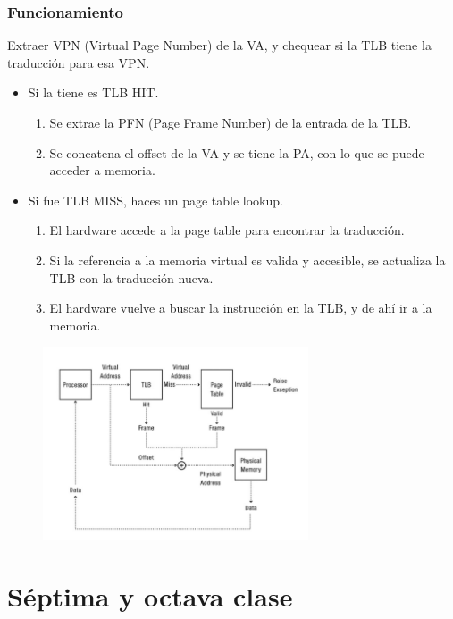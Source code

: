 \documentclass[titlepage,a4paper]{article}
\begin{document}
\subsubsection*{Funcionamiento}

Extraer VPN (Virtual Page Number) de la VA, y chequear si la TLB tiene la traducción para esa VPN. 

\begin{itemize}
\item Si la tiene es TLB HIT.
    \begin{enumerate}
        \item Se extrae la PFN (Page Frame Number) de la entrada de la TLB.
        \item Se concatena el offset de la VA y se tiene la PA, con lo que se puede acceder a memoria.
    \end{enumerate}

				
\item Si fue TLB MISS, haces un page table lookup.
    \begin{enumerate}
        \item El hardware accede a la page table para encontrar la traducción.
        \item Si la referencia a la memoria virtual es valida y accesible, se actualiza la TLB con la traducción nueva.
        \item El hardware vuelve a buscar la instrucción en la TLB, y de ahí ir a la memoria.
    \end{enumerate}
\end{itemize}

\begin{figure}[!htb]
    \centering
    \includegraphics[width=0.7\textwidth]{ImagenesApunte/tlb.jpg}
\end{figure}

\newpage

\section*{Séptima y octava clase}
\end{document}
